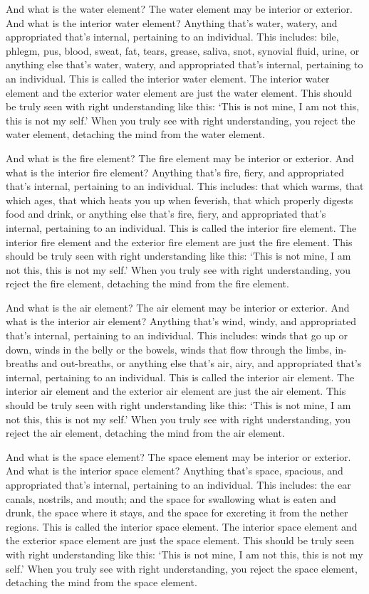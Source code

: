 \documentclass[12pt,openany]{book}%
\begin{document}
And what is the water element? The water element may be interior or exterior. And what is the interior water element? Anything that’s water, watery, and appropriated that’s internal, pertaining to an individual. This includes: bile, phlegm, pus, blood, sweat, fat, tears, grease, saliva, snot, synovial fluid, urine, or anything else that’s water, watery, and appropriated that’s internal, pertaining to an individual. This is called the interior water element. The interior water element and the exterior water element are just the water element. This should be truly seen with right understanding like this: ‘This is not mine, I am not this, this is not my self.’ When you truly see with right understanding, you reject the water element, detaching the mind from the water element. 

And what is the fire element? The fire element may be interior or exterior. And what is the interior fire element? Anything that’s fire, fiery, and appropriated that’s internal, pertaining to an individual. This includes: that which warms, that which ages, that which heats you up when feverish, that which properly digests food and drink, or anything else that’s fire, fiery, and appropriated that’s internal, pertaining to an individual. This is called the interior fire element. The interior fire element and the exterior fire element are just the fire element. This should be truly seen with right understanding like this: ‘This is not mine, I am not this, this is not my self.’ When you truly see with right understanding, you reject the fire element, detaching the mind from the fire element. 

And what is the air element? The air element may be interior or exterior. And what is the interior air element? Anything that’s wind, windy, and appropriated that’s internal, pertaining to an individual. This includes: winds that go up or down, winds in the belly or the bowels, winds that flow through the limbs, in-breaths and out-breaths, or anything else that’s air, airy, and appropriated that’s internal, pertaining to an individual. This is called the interior air element. The interior air element and the exterior air element are just the air element. This should be truly seen with right understanding like this: ‘This is not mine, I am not this, this is not my self.’ When you truly see with right understanding, you reject the air element, detaching the mind from the air element. 

And what is the space element? The space element may be interior or exterior. And what is the interior space element? Anything that’s space, spacious, and appropriated that’s internal, pertaining to an individual. This includes: the ear canals, nostrils, and mouth; and the space for swallowing what is eaten and drunk, the space where it stays, and the space for excreting it from the nether regions. This is called the interior space element. The interior space element and the exterior space element are just the space element. This should be truly seen with right understanding like this: ‘This is not mine, I am not this, this is not my self.’ When you truly see with right understanding, you reject the space element, detaching the mind from the space element. 
\end{document}
